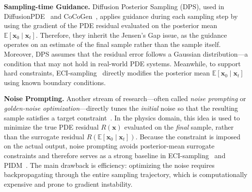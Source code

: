 \documentclass{article}
\theoremstyle{plain}
\theoremstyle{definition}
\theoremstyle{remark}
\def\vx{{\bm{x}}}
\begin{document}
\textbf{Sampling-time Guidance.} Diffusion Posterior Sampling (DPS), used in DiffusionPDE~\cite{huang2024diffusionpde} and CoCoGen~\cite{jacobsen2024cocogen}, applies guidance during each sampling step by using the gradient of the PDE residual evaluated on the posterior mean \(\mathbb{E}[\bm x_0 \mid \bm x_t]\). Therefore, they inherit the Jensen’s Gap issue, as the guidance operates on an estimate of the final sample rather than the sample itself. Moreover, DPS assumes that the residual error follows a Gaussian distribution—a condition that may not hold in real-world PDE systems. Meanwhile, to support hard constraints, ECI-sampling~\cite{cheng2025eci} directly modifies the posterior mean \(\mathbb{E}[\vx_0 \mid \vx_t]\) using known boundary conditions.

\textbf{Noise Prompting.} Another stream of research—often called \emph{noise prompting} or \emph{golden-noise optimization}—directly tunes the \emph{initial} noise so that the resulting sample satisfies a target constraint~\cite{ben2024dflow,guo2024initno_goldennoise,zhou2024golden,wang2024silent,mao2024lottery,chen2024find}.
In the physics domain, this idea is used to minimize the true PDE residual \(R(\vx)\) evaluated on the \emph{final} sample, rather than the surrogate residual \(R(\mathbb{E}[\vx_0 \mid \vx_t])\). Because the constraint is imposed on the actual output, noise prompting avoids posterior-mean surrogate constraints and therefore serves as a strong baseline in ECI-sampling~\cite{cheng2025eci} and PIDM~\cite{bastek2025pdim}. The main drawback is efficiency: optimizing the noise requires backpropagating through the entire sampling trajectory, which is computationally expensive and prone to gradient instability.
\end{document}
